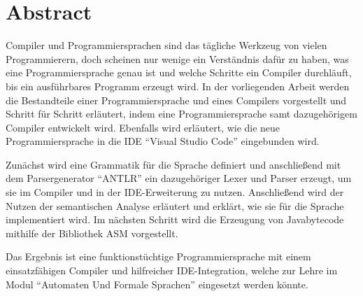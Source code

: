 \chapter*{Abstract}

Compiler und Programmiersprachen sind das tägliche Werkzeug von vielen Programmierern, doch scheinen nur wenige ein Verständnis dafür zu haben, was eine Programmiersprache genau ist und welche Schritte ein Compiler durchläuft, bis ein ausführbares Programm erzeugt wird. In der vorliegenden Arbeit werden die Bestandteile einer Programmiersprache und eines Compilers vorgestellt und Schritt für Schritt erläutert, indem eine Programmiersprache samt dazugehörigem Compiler entwickelt wird. Ebenfalls wird erläutert, wie die neue Programmiersprache in die IDE \enquote{Visual Studio Code} eingebunden wird.

Zunächst wird eine Grammatik für die Sprache definiert und anschließend mit dem Parsergenerator \enquote{ANTLR} ein dazugehöriger Lexer und Parser erzeugt, um sie im Compiler und in der IDE-Erweiterung zu nutzen. Anschließend wird der Nutzen der semantischen Analyse erläutert und erklärt, wie sie für die Sprache implementiert wird. Im nächsten Schritt wird die Erzeugung von Javabytecode mithilfe der Bibliothek ASM vorgestellt.

Das Ergebnis ist eine funktionstüchtige Programmiersprache mit einem einsatzfähigen Compiler und hilfreicher IDE-Integration, welche zur Lehre im Modul \enquote{Automaten Und Formale Sprachen} eingesetzt werden könnte.